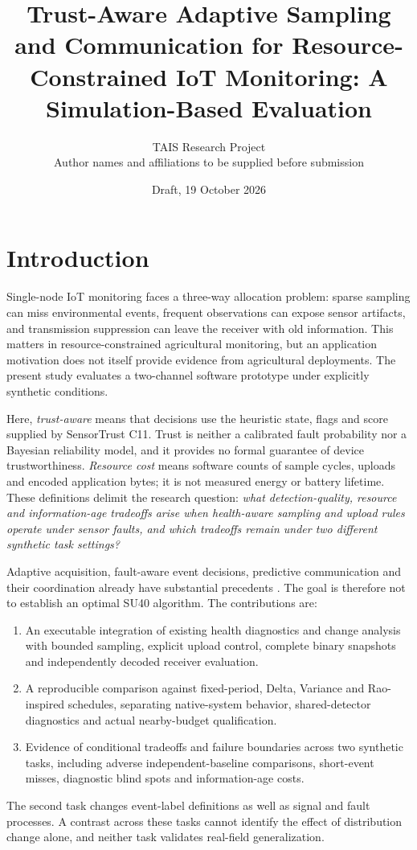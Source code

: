 \documentclass[10pt]{article}
\title{Trust-Aware Adaptive Sampling and Communication for Resource-Constrained IoT Monitoring: A Simulation-Based Evaluation}
\author{TAIS Research Project\\\small Author names and affiliations to be supplied before submission}
\date{Draft, 19 October 2026}
\begin{document}
\maketitle
\begin{abstract}

\end{abstract}

\section{Introduction}
Single-node IoT monitoring faces a three-way allocation problem: sparse sampling can miss environmental events, frequent observations can expose sensor artifacts, and transmission suppression can leave the receiver with old information. This matters in resource-constrained agricultural monitoring, but an application motivation does not itself provide evidence from agricultural deployments. The present study evaluates a two-channel software prototype under explicitly synthetic conditions.

Here, \emph{trust-aware} means that decisions use the heuristic state, flags and score supplied by SensorTrust C11. Trust is neither a calibrated fault probability nor a Bayesian reliability model, and it provides no formal guarantee of device trustworthiness. \emph{Resource cost} means software counts of sample cycles, uploads and encoded application bytes; it is not measured energy or battery lifetime. These definitions delimit the research question: \emph{what detection-quality, resource and information-age tradeoffs arise when health-aware sampling and upload rules operate under sensor faults, and which tradeoffs remain under two different synthetic task settings?}

Adaptive acquisition, fault-aware event decisions, predictive communication and their coordination already have substantial precedents \citep{rao2019adaptive,masoum2012quality,yim2010fault,dias2017dual,arnaiz2024energy}. The goal is therefore not to establish an optimal SU40 algorithm. The contributions are:
\begin{enumerate}
\item An executable integration of existing health diagnostics and change analysis with bounded sampling, explicit upload control, complete binary snapshots and independently decoded receiver evaluation.
\item A reproducible comparison against fixed-period, Delta, Variance and Rao-inspired schedules, separating native-system behavior, shared-detector diagnostics and actual nearby-budget qualification.
\item Evidence of conditional tradeoffs and failure boundaries across two synthetic tasks, including adverse independent-baseline comparisons, short-event misses, diagnostic blind spots and information-age costs.
\end{enumerate}
The second task changes event-label definitions as well as signal and fault processes. A contrast across these tasks cannot identify the effect of distribution change alone, and neither task validates real-field generalization.
\end{document}
